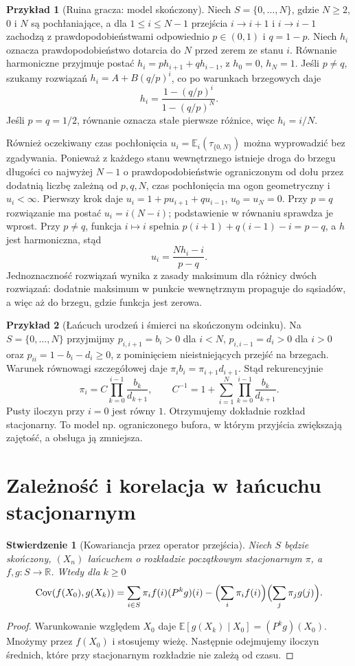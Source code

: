 \documentclass[11pt,a4paper,oneside]{report}
\numberwithin{equation}{chapter}
\theoremstyle{plain}
\newtheorem{stwierdzenie}[twierdzenie]{Stwierdzenie}
\theoremstyle{definition}
\newtheorem{przyklad}{Przykład}[chapter]
\theoremstyle{remark}
\newcommand{\R}{\mathbb{R}}
\newcommand{\E}{\mathbb{E}}
\newcommand{\Cov}{\operatorname{Cov}}
\begin{document}
\begin{przyklad}[Ruina gracza: model skończony]
Niech $S=\{0,\ldots,N\}$, gdzie $N\geq2$,
$0$ i $N$ są pochłaniające,
a dla $1\leq i\leq N-1$
przejścia $i\to i+1$ i $i\to i-1$ zachodzą
z prawdopodobieństwami odpowiednio $p\in(0,1)$
i $q=1-p$. Niech $h_i$ oznacza prawdopodobieństwo
dotarcia do $N$ przed zerem ze stanu $i$.
Równanie harmoniczne przyjmuje postać
$h_i=ph_{i+1}+qh_{i-1}$, z $h_0=0$, $h_N=1$.
Jeśli $p\ne q$, szukamy rozwiązań $h_i=A+B(q/p)^i$,
co po warunkach brzegowych daje
\[
h_i=\frac{1-(q/p)^i}{1-(q/p)^N}.
\]
Jeśli $p=q=1/2$, równanie oznacza stałe
pierwsze różnice, więc $h_i=i/N$.

Również oczekiwany czas pochłonięcia
$u_i=\E_i(\tau_{\{0,N\}})$ można wyprowadzić
bez zgadywania. Ponieważ z każdego stanu wewnętrznego
istnieje droga do brzegu długości co najwyżej $N-1$
o prawdopodobieństwie ograniczonym od dołu przez
dodatnią liczbę zależną od $p,q,N$, czas
pochłonięcia ma ogon geometryczny i $u_i<\infty$.
Pierwszy krok daje $u_i=1+pu_{i+1}+qu_{i-1}$,
$u_0=u_N=0$. Przy $p=q$ rozwiązanie ma postać
$u_i=i(N-i)$; podstawienie w równaniu sprawdza
je wprost. Przy $p\ne q$, funkcja $i\mapsto i$
spełnia $p(i+1)+q(i-1)-i=p-q$,
a $h$ jest harmoniczna, stąd
\[
u_i=\frac{Nh_i-i}{p-q}.
\]
Jednoznaczność rozwiązań wynika z zasady maksimum
dla różnicy dwóch rozwiązań: dodatnie maksimum
w punkcie wewnętrznym propaguje do sąsiadów,
a więc aż do brzegu, gdzie funkcja jest zerowa.
\end{przyklad}

\begin{przyklad}[Łańcuch urodzeń i śmierci na skończonym odcinku]
Na $S=\{0,\ldots,N\}$ przyjmijmy
$p_{i,i+1}=b_i>0$ dla $i<N$,
$p_{i,i-1}=d_i>0$ dla $i>0$ oraz
$p_{ii}=1-b_i-d_i\geq0$, z pominięciem
nieistniejących przejść na brzegach.
Warunek równowagi szczegółowej daje
$\pi_i b_i=\pi_{i+1}d_{i+1}$.
Stąd rekurencyjnie
\[
\pi_i=C\prod_{k=0}^{i-1}\frac{b_k}{d_{k+1}},
\qquad
C^{-1}=1+\sum_{i=1}^N\prod_{k=0}^{i-1}
\frac{b_k}{d_{k+1}}.
\]
Pusty iloczyn przy $i=0$ jest równy $1$.
Otrzymujemy dokładnie rozkład stacjonarny.
To model np. ograniczonego bufora, w którym
przyjścia zwiększają zajętość, a obsługa ją zmniejsza.
\end{przyklad}

\section{Zależność i korelacja w łańcuchu stacjonarnym}

\begin{stwierdzenie}[Kowariancja przez operator przejścia]
Niech $S$ będzie skończony, $(X_n)$ łańcuchem
o rozkładzie początkowym stacjonarnym $\pi$, a
$f,g:S\to\R$. Wtedy dla $k\geq0$
\[
\Cov(f(X_0),g(X_k))=
\sum_{i\in S}\pi_i f(i)(P^kg)(i)
-\Bigl(\sum_i\pi_i f(i)\Bigr)
 \Bigl(\sum_j\pi_jg(j)\Bigr).
\]
\end{stwierdzenie}
\begin{proof}
Warunkowanie względem $X_0$ daje
$\E[g(X_k)\mid X_0]=(P^kg)(X_0)$.
Mnożymy przez $f(X_0)$ i stosujemy wieżę.
Następnie odejmujemy iloczyn średnich,
które przy stacjonarnym rozkładzie
nie zależą od czasu.
\end{proof}
\end{document}
